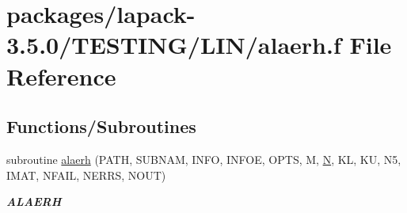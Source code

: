 \hypertarget{alaerh_8f}{}\section{packages/lapack-\/3.5.0/\+T\+E\+S\+T\+I\+N\+G/\+L\+I\+N/alaerh.f File Reference}
\label{alaerh_8f}
\subsection*{Functions/\+Subroutines}
\begin{DoxyCompactItemize}
\item 
subroutine \hyperlink{group__aux__lin_ga544fc1eb5882794214238ad87cda0b40}{alaerh} (P\+A\+T\+H, S\+U\+B\+N\+A\+M, I\+N\+F\+O, I\+N\+F\+O\+E, O\+P\+T\+S, M, \hyperlink{polmisc_8c_a0240ac851181b84ac374872dc5434ee4}{N}, K\+L, K\+U, N5, I\+M\+A\+T, N\+F\+A\+I\+L, N\+E\+R\+R\+S, N\+O\+U\+T)
\begin{DoxyCompactList}\small\item\em {\bfseries A\+L\+A\+E\+R\+H} \end{DoxyCompactList}\end{DoxyCompactItemize}
